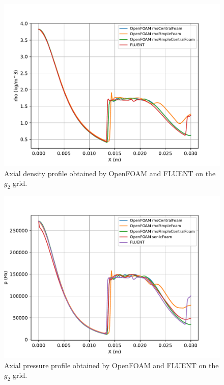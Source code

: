 \documentclass[12pt]{article}
\begin{document}
\begin{figure}[H]
    \centering
    \includegraphics[width=0.9\linewidth]{figs/profile_density_OF_vs_F.pdf}
    \caption{Axial density profile obtained by OpenFOAM and FLUENT on the $g_2$ grid.}
    \label{fig:prof_rho}
\end{figure}
\begin{figure}[H]
    \centering
    \includegraphics[width=0.9\linewidth]{figs/profile_pressure_OF_vs_F.pdf}
    \caption{Axial pressure profile obtained by OpenFOAM and FLUENT on the $g_2$ grid.}
    \label{fig:prof_p}
\end{figure}
\end{document}
